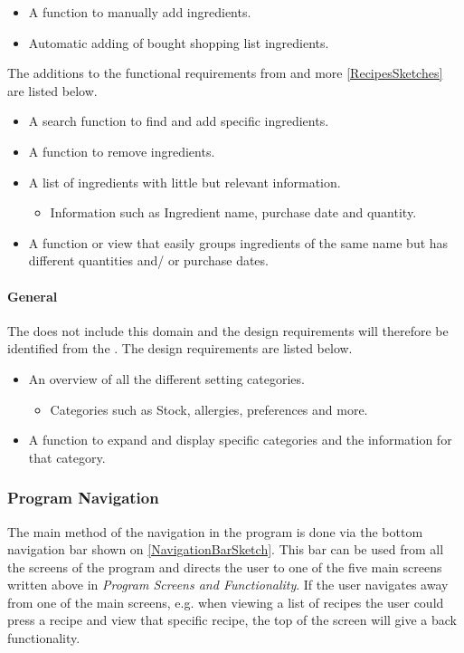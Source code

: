 \begin{itemize}
	\item A function to manually add ingredients.
	\item Automatic adding of bought shopping list ingredients.
\end{itemize}

The additions to the functional requirements from  and more \cref{RecipesSketches} are listed below.

\begin{itemize}
	\item A search function to find and add specific ingredients.
	\item A function to remove ingredients.
	\item A list of ingredients with little but relevant information.
		\begin{itemize}
			\item Information such as Ingredient name, purchase date and quantity.
		\end{itemize}
	\item A function or view that easily groups ingredients of the same name but has different quantities and/ or purchase dates.
\end{itemize}  

\paragraph{General}   
The  does not include this domain and the design requirements will therefore be identified from the . The design requirements are listed below.

\begin{itemize}
	\item An overview of all the different setting categories.
		\begin{itemize}
			\item Categories such as Stock, allergies, preferences and more.
		\end{itemize}
	\item A function to expand and display specific categories and the information for that category.
\end{itemize} 
 
\subsubsection{Program Navigation}
The main method of the navigation in the program is done via the bottom navigation bar shown on \cref{NavigationBarSketch}. This bar can be used from all the screens of the program and directs the user to one of the five main screens written above in \textit{Program Screens and Functionality}. If the user navigates away from one of the main screens, e.g. when viewing a list of recipes the user could press a recipe and view that specific recipe, the top of the screen will give a back functionality. 

